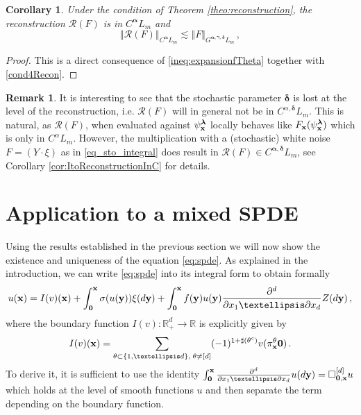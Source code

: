 \documentclass[12pt]{article}
\numberwithin{equation}{section}
\theoremstyle{plain}
\newtheorem{corollary}[theorem]{Corollary}
\theoremstyle{definition}
\newtheorem{remark}[theorem]{Remark}
\newcommand{\norm}[1]{\left\Vert #1\right\Vert}
\def\cR{\mathcal{R}}\def\cE{\mathcal{E}}
\def\fy{\mathbf y}\def\fz{\mathbf z}
\def\falpha{{\boldsymbol\alpha}}
\def\fgamma{{\boldsymbol\gamma}}
\def\fdelta{{\boldsymbol\delta}}
\def\flambda{{\boldsymbol\lambda}}
\def\foo{{\boldsymbol 0}}
\begin{document}
\begin{corollary}\label{cor:reconExtendedCoherent}
    Under the condition of Theorem \ref{theo:reconstruction}, the reconstruction $\mathcal{R}(F)$ is in $C^{\falpha}L_m$ and
\begin{equation}\label{ineq:continuityReconstructionAlpha}
        \norm{\mathcal{R}(F)}_{C^\falpha L_m}\lesssim \norm{F}_{G^{\falpha,\fgamma,\fdelta}L_m}\,,
    \end{equation}
\end{corollary}

\begin{proof}
This is a direct consequence of \eqref{ineq:expansionfTheta} together with \eqref{cond4Recon}.

\end{proof}

\begin{remark}\label{rem:ReconLosesDelta}
  It is interesting to see that  the stochastic parameter $\fdelta$ is lost  at  the level of the reconstruction, i.e. $\cR(F)$ will in general not be in $C^{\alpha,\fdelta}L_m$. This is natural, as $\cR(F)$, when evaluated against $\psi^{\flambda}_{\fx}$ locally behaves like $F_\fx(\psi^{\flambda}_{\fx})$ which is only in $C^{\alpha}L_m$. However, the multiplication with a (stochastic) white noise $F=(Y\cdot\xi)$ as in \eqref{eq_sto_integral} does result in $\cR(F)\in C^{\falpha,\fdelta}L_m$, see Corollary \ref{cor:ItoReconstructionInC} for details.
\end{remark}


\section{Application to a mixed SPDE}\label{spde_section}
Using the results established in the previous section  we will now show the existence and uniqueness of the equation \eqref{eq:spde}. As explained in the introduction, we can write \eqref{eq:spde} into its integral form to obtain formally 
\[
   u(\fx) =  I(v)(\fx) + \int_{\foo}^{\fx} \sigma(u(\fy)) \xi(d\fy) + \int_\foo^\fx f(\fy)u(\fy)\frac{\partial^d }{\partial x_1\ldots \partial x_d}Z(d\fy) \,,
\]
where the boundary function $I(v)\colon \mathbb R^d_+\to \mathbb R$ is explicitly given by 
\begin{equation}\label{equation_boundary_function}
   I(v)(\fx)= \sum_{\theta\subset\{1, \ldots d\},\; \theta\neq [d]} (-1)^{1+\sharp(\theta^c)} v(\pi^{\theta}_{\fx}\foo)\,.
\end{equation}
To derive it, it is sufficient to use the identity
$\int_\foo^\fx\frac{\partial^d }{\partial x_1\ldots \partial x_d}u(d\fy)=\square_{\foo,\fx}^{[d]}u$
which holds at the level of smooth functions $u$ and then separate the term depending on the boundary function. 
\end{document}
